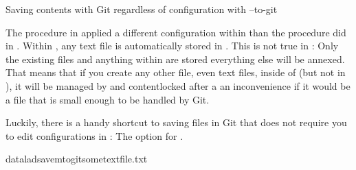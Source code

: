 \ignorespaces \begin{findoutmore}[label={index-9}, before title={\thetcbcounter\ }, check odd page=true]{Saving contents with Git regardless of configuration with –to-git}
\label{\detokenize{basics/101-130-yodaproject:index-9}}

\sphinxAtStartPar
The  procedure in  applied a different configuration
within  than the  procedure did in .
Within , any text file is automatically stored in {\hyperref[\detokenize{glossary:term-Git}]{}}.
This is not true in : Only the existing  files and
anything within  are stored \textendash{} everything else will be annexed.
That means that if you create any other file, even text files, inside of
 (but not in ), it will be managed by {\hyperref[\detokenize{glossary:term-git-annex}]{}}
and content\sphinxhyphen{}locked after a  \textendash{} an inconvenience if it
would be a file that is small enough to be handled by Git.

\sphinxAtStartPar
Luckily, there is a handy shortcut to saving files in Git that does not
require you to edit configurations in : The 
option for .

\begin{sphinxVerbatim}[commandchars=\\\{\}]
dataladsave\PYGZhy{}m\PYGZhy{}\PYGZhy{}to\PYGZhy{}gitsometextfile.txt
\end{sphinxVerbatim}


\end{findoutmore}

